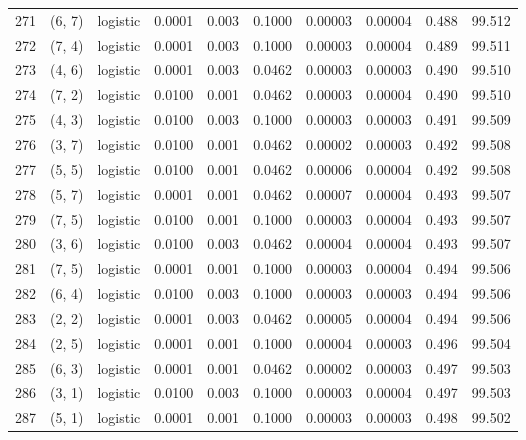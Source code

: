 \begin{tabular}{lllrrrrrrr}
271 &      (6, 7) &  logistic &  0.0001 &  0.003 &  0.1000 &          0.00003 &    0.00004 &       0.488 &    99.512 \\
272 &      (7, 4) &  logistic &  0.0001 &  0.003 &  0.1000 &          0.00003 &    0.00004 &       0.489 &    99.511 \\
273 &      (4, 6) &  logistic &  0.0001 &  0.003 &  0.0462 &          0.00003 &    0.00003 &       0.490 &    99.510 \\
274 &      (7, 2) &  logistic &  0.0100 &  0.001 &  0.0462 &          0.00003 &    0.00004 &       0.490 &    99.510 \\
275 &      (4, 3) &  logistic &  0.0100 &  0.003 &  0.1000 &          0.00003 &    0.00003 &       0.491 &    99.509 \\
276 &      (3, 7) &  logistic &  0.0100 &  0.001 &  0.0462 &          0.00002 &    0.00003 &       0.492 &    99.508 \\
277 &      (5, 5) &  logistic &  0.0100 &  0.001 &  0.0462 &          0.00006 &    0.00004 &       0.492 &    99.508 \\
278 &      (5, 7) &  logistic &  0.0001 &  0.001 &  0.0462 &          0.00007 &    0.00004 &       0.493 &    99.507 \\
279 &      (7, 5) &  logistic &  0.0100 &  0.001 &  0.1000 &          0.00003 &    0.00004 &       0.493 &    99.507 \\
280 &      (3, 6) &  logistic &  0.0100 &  0.003 &  0.0462 &          0.00004 &    0.00004 &       0.493 &    99.507 \\
281 &      (7, 5) &  logistic &  0.0001 &  0.001 &  0.1000 &          0.00003 &    0.00004 &       0.494 &    99.506 \\
282 &      (6, 4) &  logistic &  0.0100 &  0.003 &  0.1000 &          0.00003 &    0.00003 &       0.494 &    99.506 \\
283 &      (2, 2) &  logistic &  0.0001 &  0.003 &  0.0462 &          0.00005 &    0.00004 &       0.494 &    99.506 \\
284 &      (2, 5) &  logistic &  0.0001 &  0.001 &  0.1000 &          0.00004 &    0.00003 &       0.496 &    99.504 \\
285 &      (6, 3) &  logistic &  0.0001 &  0.001 &  0.0462 &          0.00002 &    0.00003 &       0.497 &    99.503 \\
286 &      (3, 1) &  logistic &  0.0100 &  0.003 &  0.1000 &          0.00003 &    0.00004 &       0.497 &    99.503 \\
287 &      (5, 1) &  logistic &  0.0001 &  0.001 &  0.1000 &          0.00003 &    0.00003 &       0.498 &    99.502 \\

\end{tabular}
